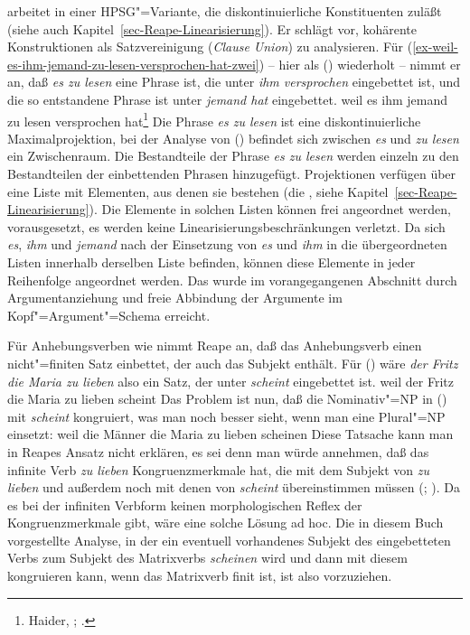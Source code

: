{\mbox{}\citet{Reape94a} arbeitet in einer HPSG"=Variante, die diskontinuierliche
Konstituenten zuläßt (siehe auch Kapitel~\ref{sec-Reape-Linearisierung}). 
Er schlägt vor, kohärente Konstruktionen
als Satzvereinigung (\emph{Clause Union}) zu analysieren.
Für (\ref{ex-weil-es-ihm-jemand-zu-lesen-versprochen-hat-zwei}) -- hier als ()
wiederholt -- nimmt er an, daß \emph{es zu lesen} eine Phrase ist, die unter
\emph{ihm versprochen} eingebettet ist, und die so entstandene Phrase ist unter \emph{jemand hat}
eingebettet.
\ea
\label{ex-weil-es-ihm-jemand-zu-lesen-versprochen-hat-drei}
weil    es       ihm       jemand   zu lesen versprochen hat\footnote{
Haider, \citeyear[]{Haider86c}; \citeyear[]{Haider90b}.%
}
\z
Die Phrase \emph{es zu lesen} ist eine diskontinuierliche Maximalprojektion, \dash
bei der Analyse von () befindet sich zwischen \emph{es} und \emph{zu lesen} 
ein Zwischenraum. Die Bestandteile der Phrase \emph{es zu lesen} werden einzeln
zu den Bestandteilen der einbettenden Phrasen hinzugefügt. Projektionen verfügen
über eine Liste mit Elementen, aus denen sie bestehen (die \doml, siehe
Kapitel~\ref{sec-Reape-Linearisierung}). Die Elemente in solchen Listen 
können frei angeordnet werden, vorausgesetzt, es werden keine Linearisierungsbeschränkungen
verletzt. Da sich \emph{es}, \emph{ihm} und \emph{jemand} nach der Einsetzung von \emph{es}
und \emph{ihm} in die übergeordneten Listen innerhalb derselben Liste befinden, können
diese Elemente in jeder Reihenfolge angeordnet werden. Das wurde im vorangegangenen
Abschnitt durch Argumentanziehung und freie Abbindung der Argumente im Kopf"=Argument"=Schema
erreicht.

Für Anhebungsverben wie  nimmt Reape an, daß das Anhebungsverb einen nicht"=finiten
Satz einbettet, der auch das Subjekt enthält. Für () wäre
\emph{der Fritz die Maria zu lieben} also ein Satz, der unter  \emph{scheint} eingebettet ist.
\ea
weil    der Fritz die Maria zu lieben scheint
\z
Das Problem ist nun, daß die Nominativ"=NP in () mit \emph{scheint} kongruiert, was man noch besser
sieht, wenn man eine Plural"=NP einsetzt:
\ea
weil    die Männer die Maria zu lieben scheinen
\z
Diese Tatsache kann man in Reapes Ansatz nicht erklären, es sei denn man würde
annehmen, daß das infinite Verb \emph{zu lieben} Kongruenzmerkmale hat, die mit dem
Subjekt von \emph{zu lieben} und außerdem noch mit denen von \emph{scheint} übereinstimmen
müssen (; ). 
Da es bei der infiniten Verbform keinen morphologischen Reflex der Kongruenzmerkmale
gibt, wäre eine solche Lösung ad hoc. Die in diesem Buch vorgestellte Analyse, in der
ein eventuell vorhandenes Subjekt des eingebetteten Verbs zum Subjekt des Matrixverbs \emph{scheinen}
wird und dann mit diesem kongruieren kann, wenn das Matrixverb finit ist, ist also vorzuziehen.

}
